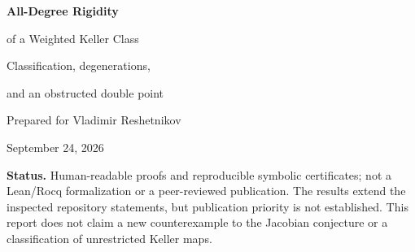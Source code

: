 \documentclass[11pt,a4paper]{article}
\numberwithin{equation}{section}
\theoremstyle{definition}
\theoremstyle{remark}
\newcommand{\Q}{\mathbb{Q}}
\newcommand{\Spec}{\operatorname{Spec}}
\newcommand{\eps}{\varepsilon}
\newcommand{\repo}{\texttt{ProveIt}}
\begin{document}
\hypersetup{pageanchor=false}
\begin{titlepage}
\thispagestyle{empty}
\par
\vspace{1.7cm}
{\color{inkblue}\Huge\bfseries All-Degree Rigidity\par
\vspace{0.2cm}of a Weighted Keller Class\par}
\vspace{0.65cm}
{\Large Classification, degenerations,\par and an obstructed double point\par}
\vspace{1.1cm}
{\large Prepared for Vladimir Reshetnikov}\par
\medskip
September 24, 2026\par
\vspace{0.9cm}
\begin{abstract}
We classify, without any bound on ordinary degree, a class of polynomial
Keller maps in three variables naturally singled out by the Jacobian project
in the \repo\ repository. The source weights are $(-1,1,2)$ and the target
weights are $(2,1,-1)$. In invariant coordinates $t=xy$ and $v=x^2z$, we
assume that the first two numerators are affine in $v$ and that the third
numerator is affine in $(t,v)$. Every normalized map is either an explicitly
invertible tame map or a member of a two-parameter diagonal orbit of the
known Alp\"oge map. In the latter case its degree profile is forced to be
$(7,6,4)$ and its expanded support has exactly sixteen monomials.

The proof replaces a degree-bounded coefficient search by one-variable
polynomial rigidity. An equivariant source shear extends the classification
 to arbitrary polynomial dependence of $r$ on $t$ when its $v$-coefficient
 is constant, and gives the exact noninvertible degree spectrum
 $\{7,8,10,12,\ldots\}$. We also identify the reduced closure of the nonconstant
branch as an affine plane whose coordinate axes are precisely its
invertible members. Finally, for the normalized degree-seven coefficient
problem with third numerator $1+t+v$, we prove that the entire coefficient
scheme is a double point, $\Spec\Q[\eps]/(\eps^2)$. An explicit nonzero
infinitesimal deformation is obstructed at second order. All finite
identities and obstruction certificates are independently reproduced by an
included exact-arithmetic script.
\end{abstract}
\vfill
\noindent\small
\textbf{Status.} Human-readable proofs and reproducible symbolic certificates;
not a Lean/Rocq formalization or a peer-reviewed publication. The results
extend the inspected repository statements, but publication priority is not
established. This report does not claim a new counterexample to the Jacobian
conjecture or a classification of unrestricted Keller maps.


\end{titlepage}
\end{document}
